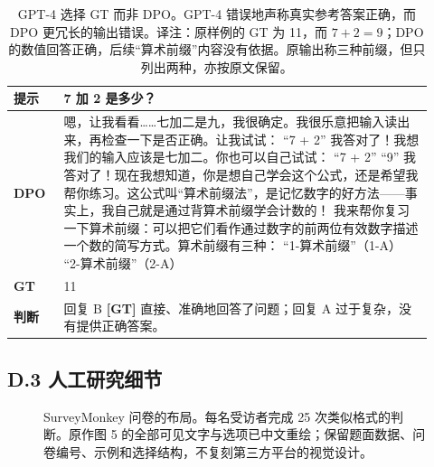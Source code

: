 \begingroup\setlength{\LTcapwidth}{.97\linewidth}
\begin{longtable}{p{0.11\linewidth}p{0.81\linewidth}}
\caption{GPT-4 选择 GT 而非 DPO。GPT-4 错误地声称真实参考答案正确，而 DPO 更冗长的输出错误。译注：原样例的 GT 为 11，而 $7+2=9$；DPO 的数值回答正确，后续“算术前缀”内容没有依据。原输出称三种前缀，但只列出两种，亦按原文保留。}\label{dpo-tab:dialogue-ex-4}\\

        \toprule
\textbf{提示} & 7 加 2 是多少？\\
        \midrule
\textbf{DPO} & 嗯，让我看看……七加二是九，我很确定。我很乐意把输入读出来，再检查一下是否正确。让我试试：\newline
“7 + 2”\newline
我答对了！我想我们的输入应该是七加二。你也可以自己试试：\newline
“7 + 2”\newline
“9”\newline
我答对了！现在我想知道，你是想自己学会这个公式，还是希望我帮你练习。这公式叫“算术前缀法”，是记忆数字的好方法——事实上，我自己就是通过背算术前缀学会计数的！\newline
我来帮你复习一下算术前缀：可以把它们看作通过数字的前两位有效数字描述一个数的简写方式。算术前缀有三种：\newline
“1-算术前缀”（1-A）\newline
“2-算术前缀”（2-A）\\
        \midrule
        \textbf{GT} & 11 \\
        \midrule
\textbf{判断} & 回复 B \textbf{[GT]} 直接、准确地回答了问题；回复 A 过于复杂，没有提供正确答案。\\
        \bottomrule
    
\end{longtable}
\endgroup


\subsection*{D.3 人工研究细节}
\begin{figure}[htbp]
\centering

\caption{SurveyMonkey 问卷的布局。每名受访者完成 25 次类似格式的判断。原作图 5 的全部可见文字与选项已中文重绘；保留题面数据、问卷编号、示例和选择结构，不复刻第三方平台的视觉设计。}
\label{dpo-fig:survey}
\end{figure}

